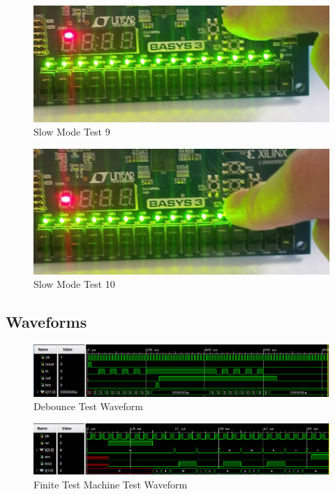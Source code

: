 \documentclass[11pt]{article}
\begin{document}
\begin{figure}[ht]\centering
\includegraphics[width=1.0\textwidth,trim=0 0mm 0 0,clip]{Slow9}
\caption{Slow Mode Test 9}
\end{figure}
\begin{figure}[ht]\centering
\includegraphics[width=1.0\textwidth,trim=0 0mm 0 0,clip]{Slow10}
\caption{Slow Mode Test 10}
\end{figure}

\clearpage

\subsection{Waveforms}

\begin{figure}[ht]\centering
	\includegraphics[width=1.0\textwidth,trim=0 0mm 0 0,clip]{Debounce}
	\caption{Debounce Test Waveform}
\end{figure}

\begin{figure}[ht]\centering
	\includegraphics[width=1.0\textwidth,trim=0 0mm 0 0,clip]{FSM}
	\caption{Finite Test Machine Test Waveform}
\end{figure}
\end{document}
